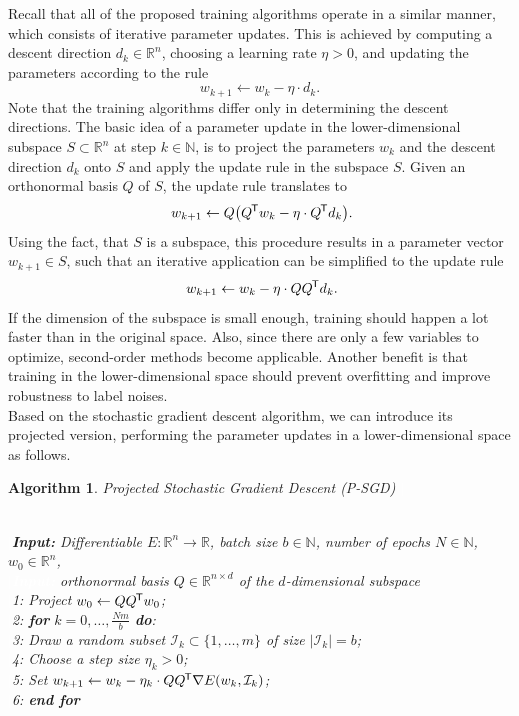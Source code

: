 \documentclass[11pt, a4paper]{article}
\newtheorem{algorithm}[theorem]{Algorithm}
\newcommand{\N}{\mathbb{N}}
\newcommand{\R}{\mathbb{R}}
\newcommand{\I}{\mathcal{I}}
\newcommand*{\tr}{^{\mkern-1.5mu\mathsf{T}}}
\begin{document}
Recall that all of the proposed training algorithms operate in a similar manner, which consists of iterative parameter updates. This is achieved by computing a descent direction $d_k \in \R^n$, choosing a learning rate $\eta > 0$, and updating the parameters according to the rule
\[ w_{k+1} \leftarrow w_k - \eta \cdot d_k. \]
Note that the training algorithms differ only in determining the descent directions. The basic idea of a parameter update in the  lower-dimensional subspace $S \subset \R^n$ at step $k \in \N$, is to project the parameters $w_k$ and the descent direction $d_k$ onto $S$ and apply the update rule in the subspace $S$. Given an orthonormal basis $Q$ of $S$, the update rule translates to
\[ w_{k+1} \leftarrow Q \big ( Q \tr w_k - \eta \cdot Q \tr d_k \big ). \]
Using the fact, that $S$ is a subspace, this procedure results in a parameter vector $w_{k+1} \in S$, such that an iterative application can be simplified to the update rule
\[ w_{k+1} \leftarrow w_k - \eta \cdot Q Q \tr d_k. \]
If the dimension of the subspace is small enough, training should happen a lot faster than in the original space. Also, since there are only a few variables to optimize, second-order methods become applicable. Another benefit is that training in the lower-dimensional space should prevent overfitting and improve robustness to label noises. \\

Based on the stochastic gradient descent algorithm, we can introduce its projected version, performing the parameter updates in a lower-dimensional space as follows.

\begin{algorithm}
\caption{Projected Stochastic Gradient Descent (P-SGD) \textcolor{white}{$\Big |$}} \ \\
\textcolor{white}{$\Big |$}\textbf{Input:} Differentiable $E: \R^n \to \R$, batch size $b \in \N$, number of epochs $N \in \N$, $w_0 \in \R^n$, \\
\textcolor{white}{$\Big |$\textbf{Input:}} orthonormal basis $Q \in \R^{n \times d}$ of the $d$-dimensional subspace \\
\textcolor{white}{$\Big |$}1: Project $w_0 \leftarrow QQ\tr w_0$; \\
\textcolor{white}{$\Big |$}2: \textbf{for} $k=0, \dots, \frac{Nm}{b}$ \textbf{do}: \\
\textcolor{white}{$\Big |$}3: \quad Draw a random subset $\I_k \subset \{1, \dots, m \}$ of size $| \I_k | = b$; \\
\textcolor{white}{$\Big |$}4: \quad Choose a step size $\eta_k > 0$; \\
\textcolor{white}{$\Big |$}5: \quad Set $w_{k+1} \leftarrow  w_k - \eta_k \cdot QQ\tr \nabla E(w_k,\I_k)$; \\
\textcolor{white}{$\Big |$}6: \textbf{end for}
\end{algorithm}
\end{document}
